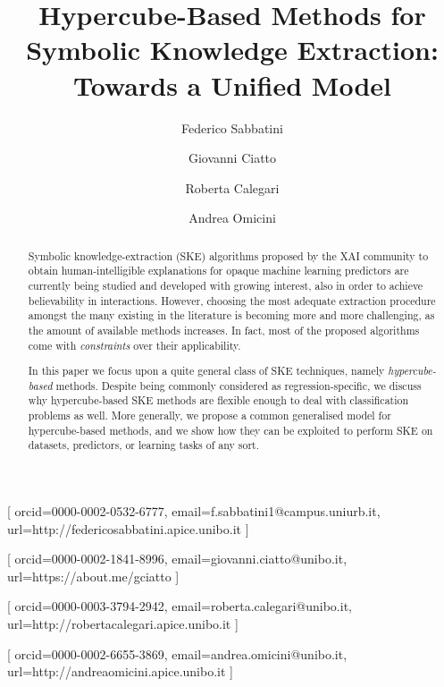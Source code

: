 \documentclass[
]{ceurart}
\begin{document}


\title{Hypercube-Based Methods for Symbolic Knowledge Extraction: Towards a Unified Model}

\author[1]{Federico Sabbatini}[%
orcid=0000-0002-0532-6777,
email=f.sabbatini1@campus.uniurb.it,
url=http://federicosabbatini.apice.unibo.it
]\cormark[1]
\address[1]{Dipartimento di Scienze Pure e Applicate (DiSPeA), Universit\`a di Urbino, Italy}

\author[2]{Giovanni Ciatto}[%
orcid=0000-0002-1841-8996,
email=giovanni.ciatto@unibo.it,
url=https://about.me/gciatto
]
\address[2]{Dipartimento di Informatica -- Scienza e Ingegneria (DISI), \textsc{Alma Mater Studiorum}---Universit\`a di Bologna, Italy}

\author[3]{Roberta Calegari}[%
orcid=0000-0003-3794-2942,
email=roberta.calegari@unibo.it,
url=http://robertacalegari.apice.unibo.it
]
\address[3]{Alma Mater Research Institute for Human-Centered Artificial Intelligence, \textsc{Alma Mater Studiorum}---Universit\`a di Bologna, Italy}

\author[2]{Andrea Omicini}[%
orcid=0000-0002-6655-3869,
email=andrea.omicini@unibo.it,
url=http://andreaomicini.apice.unibo.it
]


\begin{abstract}
Symbolic knowledge-extraction (SKE) algorithms proposed by the XAI community to obtain human-intelligible explanations for opaque machine learning predictors are currently being studied and developed with growing interest, also in order to achieve believability in interactions.
%
However, choosing the most adequate extraction procedure amongst the many existing in the literature is becoming more and more challenging, as the amount of available methods increases.
%
In fact, most of the proposed algorithms come with \emph{constraints} over their applicability.

In this paper we focus upon a quite general class of SKE techniques, namely \emph{hypercube-based} methods.
%
Despite being commonly considered as regression-specific, we discuss why hypercube-based SKE methods are flexible enough to deal with classification problems as well.
%
More generally, we propose a common generalised model for hypercube-based methods, and we show how they can be exploited to perform SKE on datasets, predictors, or learning tasks of any sort.
%
%
\end{abstract}
\end{document}
